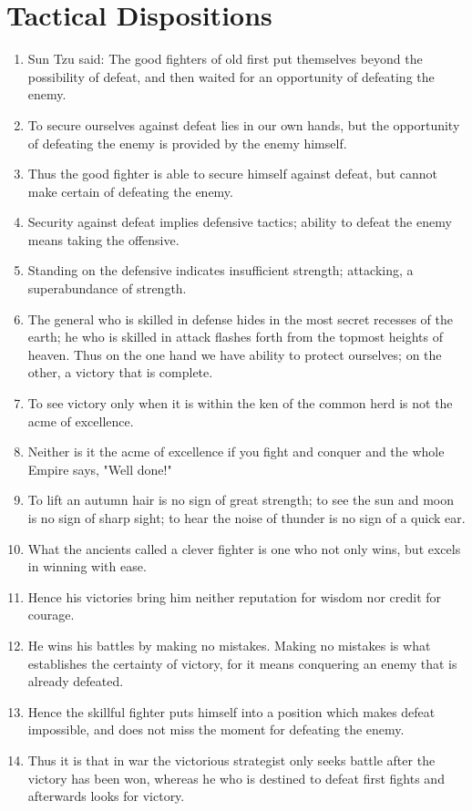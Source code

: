\documentclass[oneside]{book}
\begin{document}
\chapter{Tactical Dispositions}
\begin{enumerate}
    \item Sun Tzu said: The good fighters of old first put themselves beyond the possibility of defeat, and then waited for an opportunity of defeating the enemy.
    \item To secure ourselves against defeat lies in our own hands, but the opportunity of defeating the enemy is provided by the enemy himself.
    \item Thus the good fighter is able to secure himself against defeat, but cannot make certain of defeating the enemy.
	\item Security against defeat implies defensive tactics; ability to defeat the enemy means taking the offensive.
	\item Standing on the defensive indicates insufficient strength; attacking, a superabundance of strength.
	\item The general who is skilled in defense hides in the most secret recesses of the earth; he who is skilled in attack flashes forth from the topmost heights of heaven. Thus on the one hand we have ability to protect ourselves; on the other, a victory that is complete.
	\item To see victory only when it is within the ken of the common herd is not the acme of excellence.
	\item Neither is it the acme of excellence if you fight and conquer and the whole Empire says, "Well done!"
	\item To lift an autumn hair is no sign of great strength; to see the sun and moon is no sign of sharp sight; to hear the noise of thunder is no sign of a quick ear.
	\item What the ancients called a clever fighter is one who not only wins, but excels in winning with ease.
	\item Hence his victories bring him neither reputation for wisdom nor credit for courage.
	\item He wins his battles by making no mistakes. Making no mistakes is what establishes the certainty of victory, for it means conquering an enemy that is already defeated.
	\item Hence the skillful fighter puts himself into a position which makes defeat impossible, and does not miss the moment for defeating the enemy.
	\item Thus it is that in war the victorious strategist only seeks battle after the victory has been won, whereas he who is destined to defeat first fights and afterwards looks for victory.

\end{enumerate}
\end{document}
